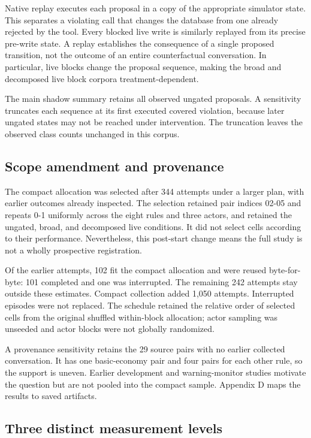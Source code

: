 Native replay executes each proposal in a copy of the appropriate
simulator state. This separates a violating call that changes the
database from one already rejected by the tool. Every blocked live write
is similarly replayed from its precise pre-write state. A replay
establishes the consequence of a single proposed transition, not the
outcome of an entire counterfactual conversation. In particular, live
blocks change the proposal sequence, making the broad and decomposed
live block corpora treatment-dependent.

The main shadow summary retains all observed ungated proposals. A
sensitivity truncates each sequence at its first executed covered
violation, because later ungated states may not be reached under
intervention. The truncation leaves the observed class counts unchanged
in this corpus.

\subsection{Scope amendment and
provenance}\label{scope-amendment-and-provenance}

The compact allocation was selected after 344 attempts under a larger
plan, with earlier outcomes already inspected. The selection retained
pair indices 02-05 and repeats 0-1 uniformly across the eight rules and
three actors, and retained the ungated, broad, and decomposed live
conditions. It did not select cells according to their performance.
Nevertheless, this post-start change means the full study is not a
wholly prospective registration.

Of the earlier attempts, 102 fit the compact allocation and were reused
byte-for-byte: 101 completed and one was interrupted. The remaining 242
attempts stay outside these estimates. Compact collection added 1,050
attempts. Interrupted episodes were not replaced. The schedule retained
the relative order of selected cells from the original shuffled
within-block allocation; actor sampling was unseeded and actor blocks
were not globally randomized.

A provenance sensitivity retains the 29 source pairs with no earlier
collected conversation. It has one basic-economy pair and four pairs for
each other rule, so the support is uneven. Earlier development and
warning-monitor studies motivate the question but are not pooled into
the compact sample. Appendix D maps the results to saved artifacts.

\subsection{Three distinct measurement
levels}\label{three-distinct-measurement-levels}

